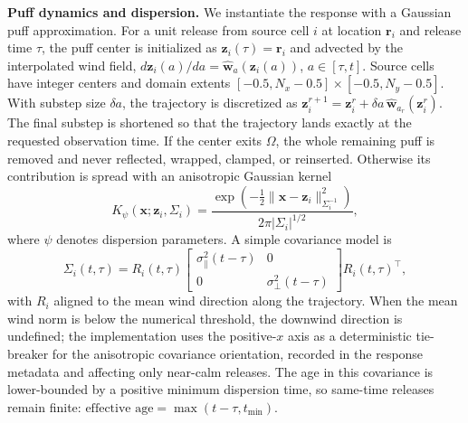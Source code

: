\noindent\textbf{Puff dynamics and dispersion.}
We instantiate the response with a Gaussian puff approximation.  For a
unit release from source cell \(i\) at location \(\mathbf r_i\) and release time
\(\tau\), the puff center is initialized as \(\mathbf z_i(\tau)=\mathbf r_i\) and
advected by the interpolated wind field,
\(d\mathbf z_i(a)/da=\widehat{\mathbf w}_a(\mathbf z_i(a))\), \(a\in[\tau,t]\).
Source cells have integer centers and domain extents
\([-0.5,N_x-0.5]\times[-0.5,N_y-0.5]\).  With substep size \(\delta a\), the
trajectory is discretized as
\(\mathbf z_i^{r+1}=\mathbf z_i^r+\delta a\,\widehat{\mathbf w}_{a_r}(\mathbf z_i^r)\).
The final substep is shortened so that the trajectory lands exactly at the
requested observation time.  If the center exits \(\Omega\), the whole
remaining puff is removed and never reflected, wrapped, clamped, or reinserted.
Otherwise its contribution is spread with an anisotropic Gaussian kernel
\begin{equation}
K_\psi(\mathbf x;\mathbf z_i,\Sigma_i)
=\frac{\exp\left(-\frac12\|\mathbf x-\mathbf z_i\|_{\Sigma_i^{-1}}^2\right)}
{2\pi |\Sigma_i|^{1/2}},
\label{eq:gaussian_kernel}
\end{equation}
where \(\psi\) denotes dispersion parameters.  A simple covariance model is
\begin{equation}
\Sigma_i(t,\tau)
= R_i(t,\tau)
\begin{bmatrix}
\sigma_\parallel^2(t-\tau) & 0\\
0 & \sigma_\perp^2(t-\tau)
\end{bmatrix}
R_i(t,\tau)^\top,
\label{eq:dispersion_covariance}
\end{equation}
with \(R_i\) aligned to the mean wind direction along the trajectory.  When the
mean wind norm is below the numerical threshold, the downwind direction is
undefined; the implementation uses the positive-\(x\) axis as a deterministic
tie-breaker for the anisotropic covariance orientation, recorded in the response
metadata and affecting only near-calm releases.  The age in this covariance is
lower-bounded by a positive minimum dispersion time, so same-time releases remain
finite: \(\text{effective age} = \max(t-\tau, t_{\min})\).

